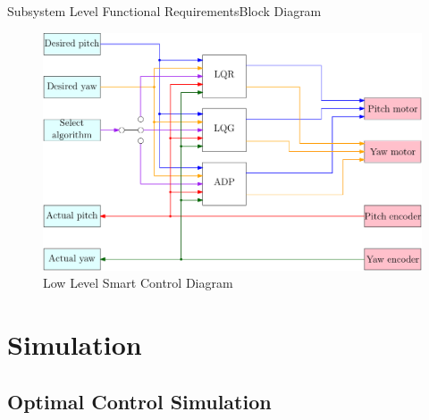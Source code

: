 \documentclass{beamer}
\begin{document}
\begin{frame}{Subsystem Level Functional Requirements}{Block Diagram} 

\begin{figure}
  \centering 
  \includegraphics[scale=0.31]{figs/ipe/lowLevel}
  \caption{Low Level Smart Control Diagram}
  \label{fig:ProposalImage}
\end{figure}

\end{frame}


\section{Simulation}

\subsection{Optimal Control Simulation}
\end{document}
